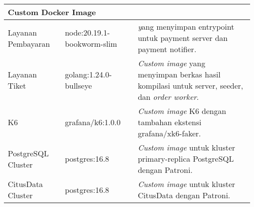 \begin{longtable}{|p{}|p{}|p{}|}
    \hline
    \multicolumn{3}{|l|}{\textbf{Custom Docker Image}}                                                                                                                           \\
    \hline
    Layanan Pembayaran               & node:20.19.1-bookworm-slim & \textit yang menyimpan entrypoint untuk payment server dan payment notifier.                                 \\
    Layanan Tiket                    & golang:1.24.0-bullseye     & \textit{Custom image} yang menyimpan berkas hasil kompilasi untuk server, seeder, dan \textit{order worker}. \\
    K6                               & grafana/k6:1.0.0           & \textit{Custom image} K6 dengan tambahan ekstensi grafana/xk6-faker.                                         \\
    PostgreSQL Cluster               & postgres:16.8              & \textit{Custom image} untuk kluster primary-replica PostgreSQL dengan Patroni.                               \\
    CitusData Cluster                & postgres:16.8              & \textit{Custom image} untuk kluster CitusData dengan Patroni.                                                \\
    \hline


\end{longtable}
